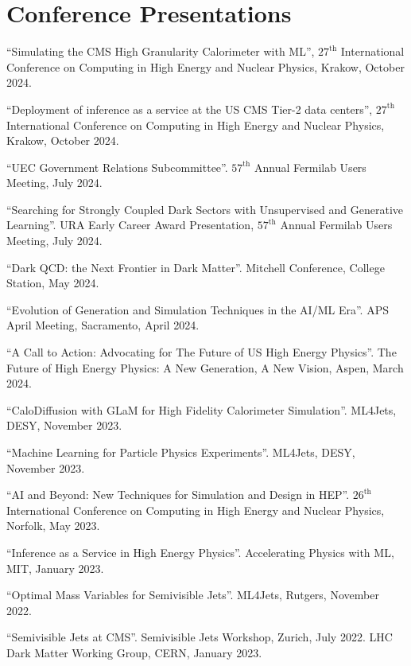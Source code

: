 \section{Conference Presentations}
\begin{description}[leftmargin=12pt,font=\normalfont,labelsep=0em]
\item ``Simulating the CMS High Granularity Calorimeter with ML'', $27^{\text{th}}$ International Conference on Computing in High Energy and Nuclear Physics, Krakow, October 2024.
\item ``Deployment of inference as a service at the US CMS Tier-2 data centers'', $27^{\text{th}}$ International Conference on Computing in High Energy and Nuclear Physics, Krakow, October 2024.
\item ``UEC Government Relations Subcommittee''. $57^{\text{th}}$ Annual Fermilab Users Meeting, July 2024.
\item ``Searching for Strongly Coupled Dark Sectors with Unsupervised and Generative Learning''. URA Early Career Award Presentation, $57^{\text{th}}$ Annual Fermilab Users Meeting, July 2024.
\item ``Dark QCD: the Next Frontier in Dark Matter''. Mitchell Conference, College Station, May 2024.
\item ``Evolution of Generation and Simulation Techniques in the AI/ML Era''. APS April Meeting, Sacramento, April 2024.
\item ``A Call to Action: Advocating for The Future of US High Energy Physics''. The Future of High Energy Physics: A New Generation, A New Vision, Aspen, March 2024.
\item ``CaloDiffusion with GLaM for High Fidelity Calorimeter Simulation''. ML4Jets, DESY, November 2023.
\item ``Machine Learning for Particle Physics Experiments''. ML4Jets, DESY, November 2023.
\item ``AI and Beyond: New Techniques for Simulation and Design in HEP''. $26^{\text{th}}$ International Conference on Computing in High Energy and Nuclear Physics, Norfolk, May 2023.
\item ``Inference as a Service in High Energy Physics''. Accelerating Physics with ML, MIT, January 2023.
\item ``Optimal Mass Variables for Semivisible Jets''. ML4Jets, Rutgers, November 2022.
\item ``Semivisible Jets at CMS''. Semivisible Jets Workshop, Zurich, July 2022. LHC Dark Matter Working Group, CERN, January 2023.

\end{description}
